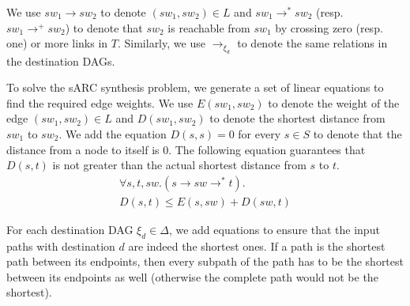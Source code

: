 We use  $sw_1\rightarrow sw_2$ to denote $(sw_1,sw_2)\in L$ and
$sw_1\rightarrow^* sw_2$ (resp. $sw_1\rightarrow^+ sw_2$) to denote 
that $sw_2$ is reachable from $sw_1$ by crossing zero (resp. one) or more links in $T$.
Similarly, we use $\rightarrow_{\xi_d}$ to denote the same relations in the destination DAGs.


To solve the sARC synthesis problem, we generate a set of linear equations
to find the required edge weights. 
We use $E(sw_1, sw_2)$ to denote the weight of the edge $(sw_1,sw_2)\in L$
and 
$D(sw_1, sw_2)$ to denote the shortest distance from $sw_1$ to $sw_2$.
We add the equation $D(s,s) = 0$ for every $s\in S$ to denote that the distance
from a node to itself is $0$.
The
following equation guarantees that $D(s,t)$ is not greater than 
the actual shortest distance from $s$ to $t$.
\begin{multline} \label{eq:dist}
\forall s, t, sw. (s \rightarrow sw \rightarrow^* t).\\
D(s, t) \leq E(s, sw) + D(sw, t)
\end{multline}

For each destination DAG $\xi_d\in\Delta$, we add equations to ensure 
that the input paths with destination $d$ are indeed the shortest ones.
 If a path
is the shortest path between its endpoints, then every 
subpath of the path has to be the shortest between its endpoints
as well (otherwise the complete path would not be the shortest).

